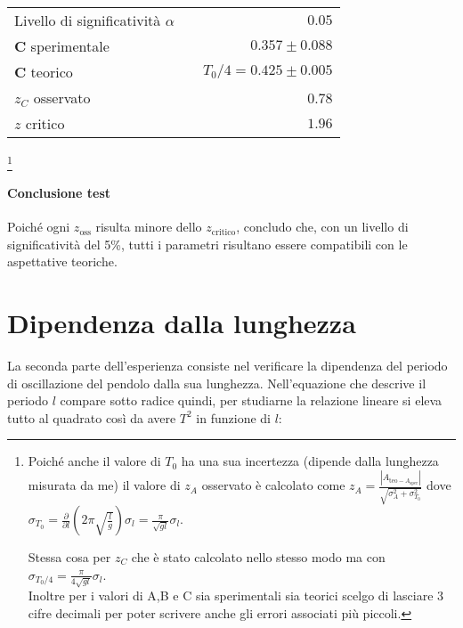 \documentclass{article}
\begin{document}
	\begin{table}[H]
		\centering
		\begin{tabular}{lr} 
			Livello di significatività $\alpha$		&$\quad 0.05$  \\
			\textbf{C} sperimentale             	& $\quad0.357 \pm 0.088$     \\
			\textbf{C} teorico					&  $\quad T_0/4 = 0.425 \pm 0.005$\\
			$z_{C}$ osservato					& 0.78 \\ 
			$z$ critico     	& $\quad 1.96$
		\end{tabular}
	\end{table}
	\footnote{Poiché anche il valore di $T_0$ ha una sua incertezza (dipende dalla lunghezza misurata da me) il valore di $z_A$ osservato è calcolato come $z_A = \frac{|A_{\text{teo} - A_{\text{sper}}}|}{\sqrt{\sigma_A^2 + \sigma_{T_0}^2}}$ dove $\sigma_{T_0} = \frac{\partial}{\partial l}\left(2\pi\sqrt{\frac{l}{g}}\right)\sigma_l =  \frac{\pi}{\sqrt{gl}} \sigma_l $. 
		
		Stessa cosa per $z_C$ che è stato calcolato nello stesso modo ma con $\sigma_{T_0/4} = \frac{\pi}{4\sqrt{gl}} \sigma_l$. \\
		
		\noindent
		Inoltre per i valori di A,B e C sia sperimentali sia teorici scelgo di lasciare 3 cifre decimali per poter scrivere anche gli errori associati più piccoli.}
	\vspace{0.7cm}
	
	\paragraph{Conclusione test}
	Poiché ogni $z_\text{oss}$ risulta minore dello $z_\text{critico}$,  concludo che, con un livello di significatività del 5\%, tutti i parametri risultano essere compatibili con le aspettative teoriche.
	
	
	\newpage
	\section{Dipendenza dalla lunghezza}
	La seconda parte dell'esperienza consiste nel verificare la dipendenza del periodo di oscillazione del pendolo dalla sua lunghezza. Nell'equazione che descrive il periodo $l$ compare sotto radice quindi, per studiarne la relazione lineare si eleva tutto al quadrato così da avere $T^2$ in funzione di $l$:
	
\end{document}
